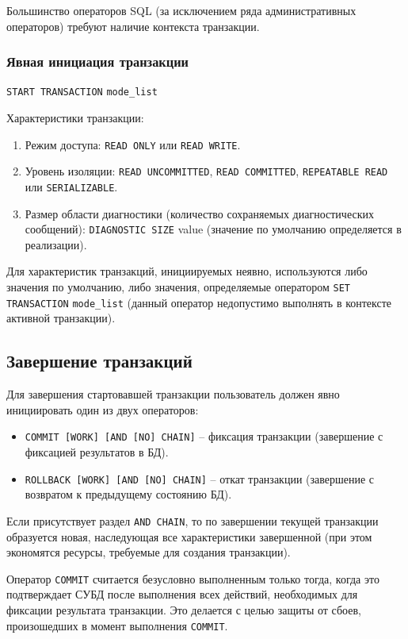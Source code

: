 \documentclass[a4paper,12pt]{article}
\begin{document}
Большинство операторов SQL (за исключением ряда административных операторов) требуют наличие контекста транзакции.

\subsubsection{Явная инициация транзакции}

\texttt{START TRANSACTION} \texttt{mode\_list}

Характеристики транзакции:
\begin{enumerate}
    \item Режим доступа: \texttt{READ ONLY} или \texttt{READ WRITE}.
    \item Уровень изоляции: \texttt{READ UNCOMMITTED}, \texttt{READ COMMITTED}, \texttt{REPEATABLE READ} или \texttt{SERIALIZABLE}.
    \item Размер области диагностики (количество сохраняемых диагностических сообщений): \texttt{DIAGNOSTIC SIZE} value (значение по умолчанию определяется в реализации).
\end{enumerate}

Для характеристик транзакций, инициируемых неявно, используются либо значения по умолчанию, либо значения, определяемые оператором \texttt{SET TRANSACTION} \texttt{mode\_list} (данный оператор недопустимо выполнять в контексте активной транзакции).

\subsection{Завершение транзакций}

Для завершения стартовавшей транзакции пользователь должен явно инициировать один из двух операторов:
\begin{itemize}
    \item \texttt{COMMIT [WORK] [AND [NO] CHAIN]} – фиксация транзакции (завершение с фиксацией результатов в БД).
    \item \texttt{ROLLBACK [WORK] [AND [NO] CHAIN]} – откат транзакции (завершение с возвратом к предыдущему состоянию БД).
\end{itemize}

Если присутствует раздел \texttt{AND CHAIN}, то по завершении текущей транзакции образуется новая, наследующая все характеристики завершенной (при этом экономятся ресурсы, требуемые для создания транзакции).

Оператор \texttt{COMMIT} считается безусловно выполненным только тогда, когда это подтверждает СУБД после выполнения всех действий, необходимых для фиксации результата транзакции. Это делается с целью защиты от сбоев, произошедших в момент выполнения \texttt{COMMIT}.
\end{document}
